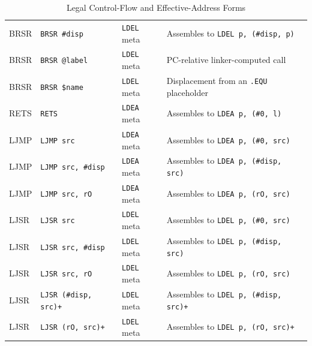 \begin{table}[H]
\begin{tabularx}{\linewidth}{lllX}
		BRSR                 & \texttt{BRSR \#disp}               & \texttt{LDEL} meta & Assembles to \texttt{LDEL p, (\#disp, p)}                                         \\
		BRSR                 & \texttt{BRSR @label}               & \texttt{LDEL} meta & PC-relative linker-computed call                                                  \\
		BRSR                 & \texttt{BRSR \$name}               & \texttt{LDEL} meta & Displacement from an \texttt{.EQU} placeholder                                    \\
		RETS                 & \texttt{RETS}                      & \texttt{LDEA} meta & Assembles to \texttt{LDEA p, (\#0, l)}                                            \\
		LJMP                 & \texttt{LJMP src}                  & \texttt{LDEA} meta & Assembles to \texttt{LDEA p, (\#0, src)}                                          \\
		LJMP                 & \texttt{LJMP src, \#disp}          & \texttt{LDEA} meta & Assembles to \texttt{LDEA p, (\#disp, src)}                                       \\
		LJMP                 & \texttt{LJMP src, rO}              & \texttt{LDEA} meta & Assembles to \texttt{LDEA p, (rO, src)}                                           \\
		LJSR                 & \texttt{LJSR src}                  & \texttt{LDEL} meta & Assembles to \texttt{LDEL p, (\#0, src)}                                          \\
		LJSR                 & \texttt{LJSR src, \#disp}          & \texttt{LDEL} meta & Assembles to \texttt{LDEL p, (\#disp, src)}                                       \\
		LJSR                 & \texttt{LJSR src, rO}              & \texttt{LDEL} meta & Assembles to \texttt{LDEL p, (rO, src)}                                           \\
		LJSR                 & \texttt{LJSR (\#disp, src)+}       & \texttt{LDEL} meta & Assembles to \texttt{LDEL p, (\#disp, src)+}                                      \\
		LJSR                 & \texttt{LJSR (rO, src)+}           & \texttt{LDEL} meta & Assembles to \texttt{LDEL p, (rO, src)+}                                          \\
		\bottomrule
	\end{tabularx}
	\caption{Legal Control-Flow and Effective-Address Forms}
	\label{tab:control-flow-legal-forms}
\end{table}

